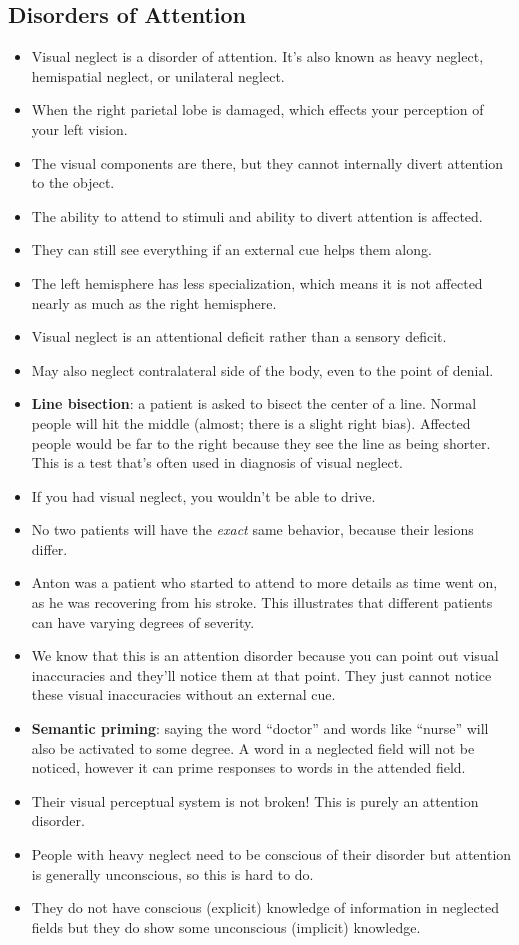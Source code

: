 \documentclass[]{article}
\newcommand{\lecture}[1]{\marginpar{{\footnotesize $\leftarrow$ \underline{#1}}}}
\begin{document}
		\subsection{Disorders of Attention} \lecture{January 31, 2013}
			\begin{itemize}
				\item Visual neglect is a disorder of attention. It's also known as heavy neglect, hemispatial neglect, or unilateral neglect.
				\item When the right parietal lobe is damaged, which effects your perception of your left vision.
				\item The visual components are there, but they cannot internally divert attention to the object.
				\item The ability to attend to stimuli and ability to divert attention is affected.
				\item They can still see everything if an external cue helps them along.
				\item The left hemisphere has less specialization, which means it is not affected nearly as much as the right hemisphere.
				\item Visual neglect is an attentional deficit rather than a sensory deficit.
				\item May also neglect contralateral side of the body, even to the point of denial.
				\item \textbf{Line bisection}: a patient is asked to bisect the center of a line. Normal people will hit the middle (almost; there is a slight right bias). Affected people would be far to the right because they see the line as being shorter. This is a test that's often used in diagnosis of visual neglect.
				\item If you had visual neglect, you wouldn't be able to drive.
				\item No two patients will have the \emph{exact} same behavior, because their lesions differ.
				\item Anton was a patient who started to attend to more details as time went on, as he was recovering from his stroke. This illustrates that different patients can have varying degrees of severity.
				\item We know that this is an attention disorder because you can point out visual inaccuracies and they'll notice them at that point. They just cannot notice these visual inaccuracies without an external cue.
				\item \textbf{Semantic priming}: saying the word ``doctor'' and words like ``nurse'' will also be activated to some degree. A word in a neglected field will not be noticed, however it can prime responses to words in the attended field.
				\item Their visual perceptual system is not broken! This is purely an attention disorder.
				\item People with heavy neglect need to be conscious of their disorder but attention is generally unconscious, so this is hard to do.
				\item They do not have conscious (explicit) knowledge of information in neglected fields but they do show some unconscious (implicit) knowledge.
			\end{itemize}
\end{document}
